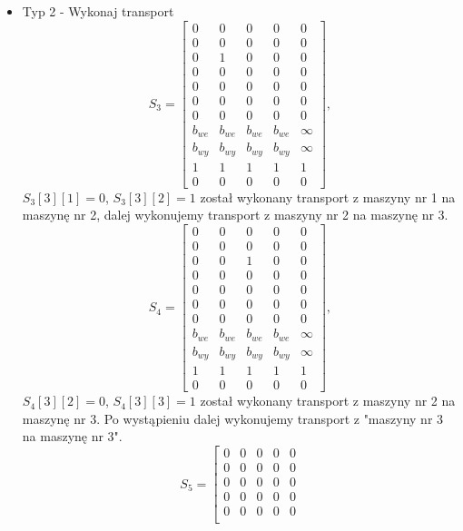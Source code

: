 \documentclass[10pt, a4paper]{article}
\begin{document}
\begin{itemize}
\item Typ 2 - Wykonaj transport
\begin{equation*}
S_3=\left[\begin{array}{ccccc}
0 & 0 & 0 & 0&0\\
0 & 0 & 0 & 0 & 0\\
0 & 1 & 0 & 0& 0\\
0 & 0 & 0 & 0& 0\\
0 & 0 & 0 & 0& 0\\
0 & 0 & 0 & 0 & 0\\
0 & 0 & 0 & 0& 0\\
b_{we}& b_{we}& b_{we}& b_{we} & \infty\\
b_{wy}& b_{wy}& b_{wy}& b_{wy} & \infty\\
1& 1& 1& 1 & 1\\
0 & 0 & 0 & 0 & 0
\end{array}\right],
\end{equation*}
$S_3[3][1]=0$, $S_3[3][2]=1$ został wykonany transport z maszyny nr 1 na maszynę nr 2, dalej wykonujemy transport z maszyny nr 2 na maszynę nr 3.
\begin{equation*}
S_4=\left[\begin{array}{ccccc}
0 & 0 & 0 & 0&0\\
0 & 0 & 0 & 0 & 0\\
0 & 0 & 1 & 0& 0\\
0 & 0 & 0 & 0& 0\\
0 & 0 & 0 & 0& 0\\
0 & 0 & 0 & 0 & 0\\
0 & 0 & 0 & 0& 0\\
b_{we}& b_{we}& b_{we}& b_{we} & \infty\\
b_{wy}& b_{wy}& b_{wy}& b_{wy} & \infty\\
1& 1& 1& 1 & 1\\
0 & 0 & 0 & 0 & 0
\end{array}\right],
\end{equation*}
$S_4[3][2]=0$, $S_4[3][3]=1$ został wykonany transport z maszyny nr 2 na maszynę nr 3. Po wystąpieniu dalej wykonujemy transport z "maszyny nr 3 na maszynę nr 3".
\begin{equation*}
S_5=\left[\begin{array}{ccccc}
0 & 0 & 0 & 0&0\\
0 & 0 & 0 & 0 & 0\\
0 & 0 & 0 & 0& 0\\
0 & 0 & 0 & 0& 0\\
0 & 0 & 0 & 0& 0\\

\end{array}
\end{equation*}
\end{itemize}
\end{document}
